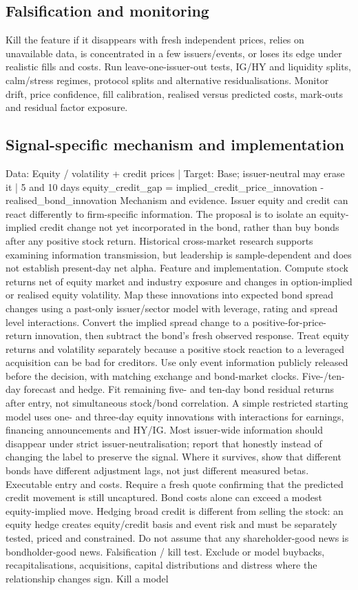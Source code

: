 \documentclass[10pt]{article}
\begin{document}
\subsection{Falsification and monitoring}
Kill the feature if it disappears with fresh independent prices, relies on unavailable data, is concentrated in a few issuers/events, or loses its edge under realistic fills and costs. Run leave-one-issuer-out tests, IG/HY and liquidity splits, calm/stress regimes, protocol splits and alternative residualisations. Monitor drift, price confidence, fill calibration, realised versus predicted costs, mark-outs and residual factor exposure.
\subsection{Signal-specific mechanism and implementation}
Data: Equity / volatility + credit prices  |  Target: Base; issuer-neutral may erase it  |  5 and 10 days equity\_credit\_gap = implied\_credit\_price\_innovation - realised\_bond\_innovation Mechanism and evidence.  Issuer equity and credit can react differently to firm-specific information. The proposal is to isolate an equity-implied credit change not yet incorporated in the bond, rather than buy bonds after any positive stock return. Historical cross-market research supports examining information transmission, but leadership is sample-dependent and does not establish present-day net alpha. Feature and implementation.  Compute stock returns net of equity market and industry exposure and changes in option-implied or realised equity volatility. Map these innovations into expected bond spread changes using a past-only issuer/sector model with leverage, rating and spread level interactions. Convert the implied spread change to a positive-for-price-return innovation, then subtract the bond’s fresh observed response. Treat equity returns and volatility separately because a positive stock reaction to a leveraged acquisition can be bad for creditors. Use only event information publicly released before the decision, with matching exchange and bond-market clocks. Five-/ten-day forecast and hedge.  Fit remaining five- and ten-day bond residual returns after entry, not simultaneous stock/bond correlation. A simple restricted starting model uses one- and three-day equity innovations with interactions for earnings, financing announcements and HY/IG. Most issuer-wide information should disappear under strict issuer-neutralisation; report that honestly instead of changing the label to preserve the signal. Where it survives, show that different bonds have different adjustment lags, not just different measured betas. Executable entry and costs.  Require a fresh quote confirming that the predicted credit movement is still uncaptured. Bond costs alone can exceed a modest equity-implied move. Hedging broad credit is different from selling the stock: an equity hedge creates equity/credit basis and event risk and must be separately tested, priced and constrained. Do not assume that any shareholder-good news is bondholder-good news. Falsification / kill test.  Exclude or model buybacks, recapitalisations, acquisitions, capital distributions and distress where the relationship changes sign. Kill a model 
\end{document}
